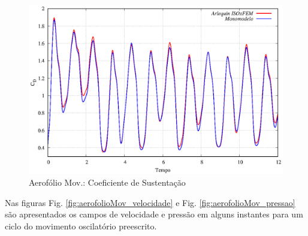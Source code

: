 \documentclass[tese_patricia]{subfiles}
\begin{document}
\begin{figure}[htb!]
	\centering 
	\includegraphics[scale=1.0,trim=0cm 0cm 0cm 0cm, clip=true]{Imagens/Cap6/aerofolioMov_CL.eps}	
	\caption{Aerofólio Mov.: Coeficiente de Sustentação}
	\label{fig:aerofolioMov_CL}
\end{figure}

Nas figuras Fig. \ref{fig:aerofolioMov_velocidade} e Fig. \ref{fig:aerofolioMov_pressao} são apresentados os campos de velocidade e pressão em alguns instantes para um ciclo do movimento oscilatório preescrito.
\end{document}
